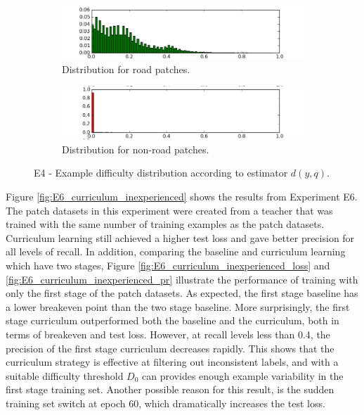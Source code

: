 \begin{figure}
\begin{subfigure}{0.5\textwidth}
\includegraphics[width=\linewidth]{figs/E4/E4-road-dist.png}
\caption{Distribution for road patches.} \label{fig:E4_difficulty_distribution_road}
\end{subfigure}
\hspace*{\fill} %
\begin{subfigure}{0.5\textwidth}
\includegraphics[width=\linewidth]{figs/E4/E4-non_road-dist.png}
\caption{Distribution for non-road patches.} \label{fig:E4_difficulty_distribution_nonroad}
\end{subfigure}
\hspace*{\fill} %
\caption[E4 - Difficulty distribution]{E4 - Example difficulty distribution according to estimator $d(y,q)$. } \label{fig:E4_difficulty_distribution}
\end{figure}

Figure \ref{fig:E6_curriculum_inexperienced} shows the results from Experiment E6. The patch datasets in this experiment were created from a teacher that was trained with the same number of training examples as the patch datasets. Curriculum learning still achieved a higher test loss and gave better precision for all levels of recall. In addition, comparing the baseline and curriculum learning which have two stages, Figure \ref{fig:E6_curriculum_inexperienced_loss} and \ref{fig:E6_curriculum_inexperienced_pr} illustrate the performance of training with only the first stage of the patch datasets. As expected, the first stage baseline has a lower breakeven point than the two stage baseline. More surprisingly, the first stage curriculum outperformed both the baseline and the curriculum, both in terms of breakeven and test loss. However, at recall levels less than 0.4, the precision of the first stage curriculum decreases rapidly. This shows that the curriculum strategy is effective at filtering out inconsistent labels, and with a suitable difficulty threshold $D_0$ can provides enough example variability in the first stage training set. Another possible reason for this result, is the sudden training set switch at epoch 60, which dramatically increases the test loss. \\

